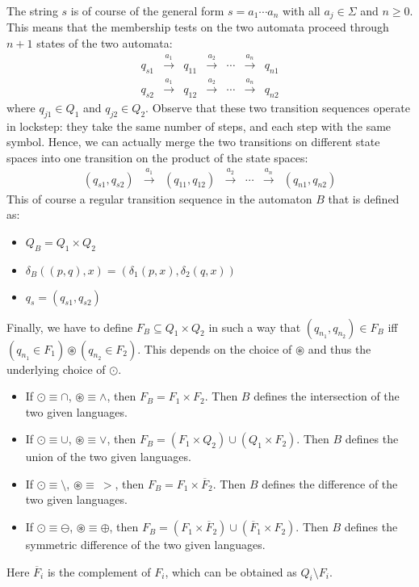 The string $s$ is of course of the general form $s = a_1 \cdots a_n$ with all $a_j \in
\Sigma$ and $n \geq 0$. This means that the membership tests on the two automata proceed
through $n + 1$ states of the two automata:
\begin{equation*}
\begin{array}{ccccccc}
q_{s1} & \stackrel{a_1}{\longrightarrow} & q_{11} & \stackrel{a_2}{\longrightarrow} & \cdots & \stackrel{a_n}{\longrightarrow} & q_{n1} \\
q_{s2} & \stackrel{a_1}{\longrightarrow} & q_{12} & \stackrel{a_2}{\longrightarrow} & \cdots & \stackrel{a_n}{\longrightarrow} & q_{n2}
\end{array}
\end{equation*}
where $q_{j1} \in Q_1$ and $q_{j2} \in Q_2$. Observe that these two transition
sequences operate in lockstep: they take the same number of steps, and each
step with the same symbol. Hence, we can actually merge the two transitions 
on different state spaces into one transition on the product of the state spaces:
\begin{equation*}
\begin{array}{ccccccc}
(q_{s1}, q_{s2}) & \stackrel{a_1}{\longrightarrow} & (q_{11}, q_{12}) & \stackrel{a_2}{\longrightarrow} & \cdots & \stackrel{a_n}{\longrightarrow} & (q_{n1}, q_{n2}) 
\end{array}
\end{equation*}
This of course a regular transition sequence in the automaton $B$ that
is defined as:
\begin{itemize}
\item $Q_B = Q_1 \times Q_2$
\item $\delta_B((p, q),x) = (\delta_1(p,x), \delta_2(q,x))$
\item $q_s = (q_{s1}, q_{s2})$
\end{itemize}
Finally, we have to define $F_B \subseteq Q_1 \times Q_2$ in such a way 
that $(q_{n_1},q_{n_2}) \in F_B$ iff $(q_{n_1} \in F_1) \circledast (q_{n_2} \in F_2)$. This depends on the choice of $\circledast$ and thus the underlying choice of $\odot$.
\begin{itemize}
\item If $\odot \equiv \cap$, $\circledast \equiv \wedge$, then $F_B = F_1
      \times F_2$. Then $B$ defines the intersection of the two given languages.
\item If $\odot \equiv \cup$, $\circledast \equiv \vee$, 
      then $F_B = (F_1 \times Q_2) \cup (Q_1 \times F_2)$. 
      Then $B$ defines the union of the two given languages.
\item If $\odot \equiv \setminus$, $\circledast \equiv\: >$, 
      then $F_B = F_1 \times \overline{F}_2$.
      Then $B$ defines the difference of the two given languages.
\item If $\odot \equiv \ominus$, $\circledast \equiv \oplus$, 
      then $F_B = (F_1 \times \overline{F}_2) \cup (\overline{F}_1 \times F_2)$.
      Then $B$ defines the symmetric difference of the two given languages.
\end{itemize}
Here $\overline{F}_i$ is the complement of $F_i$, which can be obtained as
$Q_i\setminus F_i$.

